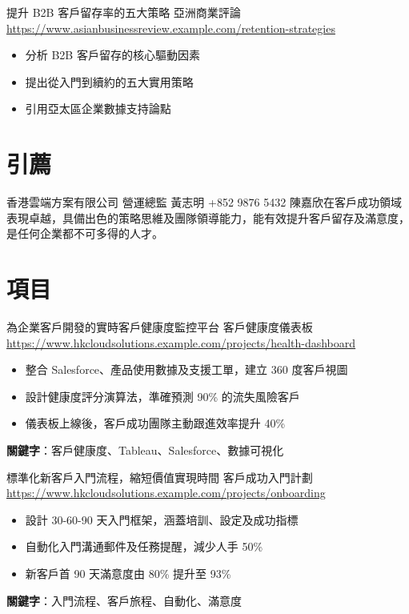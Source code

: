 \documentclass[a4paper, serif, 10pt]{moderncv}
\begin{document}
        {提升 B2B 客戶留存率的五大策略}
        {亞洲商業評論}
        {\url{https://www.asianbusinessreview.example.com/retention-strategies}}
        {}
        {\begin{itemize}
\item 分析 B2B 客戶留存的核心驅動因素
\item 提出從入門到續約的五大實用策略
\item 引用亞太區企業數據支持論點
\end{itemize}}
\section{引薦}

        {香港雲端方案有限公司 營運總監}
        {黃志明}
        {+852 9876 5432}
        {}
        {陳嘉欣在客戶成功領域表現卓越，具備出色的策略思維及團隊領導能力，能有效提升客戶留存及滿意度，是任何企業都不可多得的人才。}
\section{項目}

        {為企業客戶開發的實時客戶健康度監控平台}
        {客戶健康度儀表板}
        {\url{https://www.hkcloudsolutions.example.com/projects/health-dashboard}}
        {}
        {\begin{itemize}
\item 整合 Salesforce、產品使用數據及支援工單，建立 360 度客戶視圖
\item 設計健康度評分演算法，準確預測 90\% 的流失風險客戶
\item 儀表板上線後，客戶成功團隊主動跟進效率提升 40\%
\end{itemize}
\textbf{關鍵字}：客戶健康度、Tableau、Salesforce、數據可視化}

        {標準化新客戶入門流程，縮短價值實現時間}
        {客戶成功入門計劃}
        {\url{https://www.hkcloudsolutions.example.com/projects/onboarding}}
        {}
        {\begin{itemize}
\item 設計 30-60-90 天入門框架，涵蓋培訓、設定及成功指標
\item 自動化入門溝通郵件及任務提醒，減少人手 50\%
\item 新客戶首 90 天滿意度由 80\% 提升至 93\%
\end{itemize}
\textbf{關鍵字}：入門流程、客戶旅程、自動化、滿意度}
\end{document}
